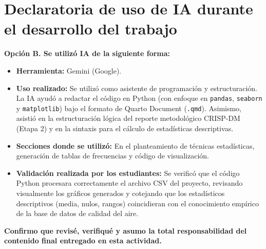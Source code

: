 \documentclass[
  11pt,
  letterpaper,
]{article}
\providecommand{\tightlist}{%
  \setlength{\itemsep}{0pt}\setlength{\parskip}{0pt}}
\begin{document}
\section{Declaratoria de uso de IA durante el desarrollo del
trabajo}\label{declaratoria-de-uso-de-ia-durante-el-desarrollo-del-trabajo}

\textbf{Opción B. Se utilizó IA de la siguiente forma:}

\begin{itemize}
\tightlist
\item
  \textbf{Herramienta:} Gemini (Google).
\item
  \textbf{Uso realizado:} Se utilizó como asistente de programación y
  estructuración. La IA ayudó a redactar el código en Python (con
  enfoque en \texttt{pandas}, \texttt{seaborn} y \texttt{matplotlib})
  bajo el formato de Quarto Document (\texttt{.qmd}). Asimismo, asistió
  en la estructuración lógica del reporte metodológico CRISP-DM (Etapa
  2) y en la sintaxis para el cálculo de estadísticas descriptivas.
\item
  \textbf{Secciones donde se utilizó:} En el planteamiento de técnicas
  estadísticas, generación de tablas de frecuencias y código de
  visualización.
\item
  \textbf{Validación realizada por los estudiantes:} Se verificó que el
  código Python procesara correctamente el archivo CSV del proyecto,
  revisando visualmente los gráficos generados y cotejando que los
  estadísticos descriptivos (media, nulos, rangos) coincidieran con el
  conocimiento empírico de la base de datos de calidad del aire.
\end{itemize}

\textbf{Confirmo que revisé, verifiqué y asumo la total responsabilidad
del contenido final entregado en esta actividad.}


\printbibliography
\end{document}
